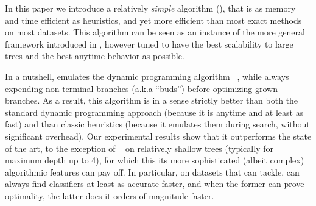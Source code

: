 \documentclass{llncs}
\begin{document}
\medskip

In this paper we introduce a relatively \emph{simple} algorithm (\budalg), that is as memory and time efficient as heuristics, and yet more efficient than most exact methods on most datasets. 
This algorithm can be seen as an instance of the more general framework introduced in \cite{DBLP:journals/corr/abs-2007-12652}, however tuned to have the best scalability to large trees and the best anytime behavior as possible.

In a nutshell, \budalg emulates the dynamic programming algorithm \dleight~\cite{dl8}, while always expending non-terminal branches (a.k.a ``buds'') before optimizing grown branches. As a result, this algorithm is in a sense strictly better than both the standard dynamic programming approach (because it is anytime and at least as fast) and than classic heuristics (because it emulates them during search, without significant overhead).
Our experimental results show that it outperforms the state of the art, to the exception of \murtree~\cite{DBLP:journals/corr/abs-2007-12652} on relatively shallow trees (typically for maximum depth up to 4), for which this its more sophisticated (albeit complex) algorithmic features can pay off.
In particular, on datasets that \dleight can tackle, \budalg can always find classifiers at least as accurate faster, and when the former can prove optimality, the latter does it orders of magnitude faster.

%
%
%
%
%
\end{document}
